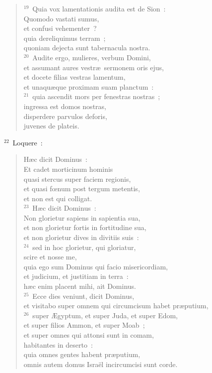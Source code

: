 \begin{verse}
${}^{19}$~Quia vox lamentationis audita est de Sion~:\\ Quomodo vastati sumus,\\ et confusi vehementer~?\\ quia dereliquimus terram~;\\ quoniam dejecta sunt tabernacula nostra.\\
${}^{20}$~Audite ergo, mulieres, verbum Domini,\\ et assumant aures vestr\ae\ sermonem oris ejus,\\ et docete filias vestras lamentum,\\ et unaqu\ae que proximam suam planctum~:\\
${}^{21}$~quia ascendit mors per fenestras nostras~;\\ ingressa est domos nostras,\\ disperdere parvulos deforis,\\ juvenes de plateis.\end{verse}


${}^{22}$~Loquere~: \begin{verse}H\ae c dicit Dominus~:\\ Et cadet morticinum hominis\\ quasi stercus super faciem regionis,\\ et quasi fœnum post tergum metentis,\\ et non est qui colligat.\\
${}^{23}$~H\ae c dicit Dominus~:\\ Non glorietur sapiens in sapientia sua,\\ et non glorietur fortis in fortitudine sua,\\ et non glorietur dives in divitiis suis~:\\
${}^{24}$~sed in hoc glorietur, qui gloriatur,\\ scire et nosse me,\\ quia ego sum Dominus qui facio misericordiam,\\ et judicium, et justitiam in terra~:\\ h\ae c enim placent mihi, ait Dominus.\\
${}^{25}$~Ecce dies veniunt, dicit Dominus,\\ et visitabo super omnem qui circumcisum habet pr\ae putium,\\
${}^{26}$~super \AE gyptum, et super Juda, et super Edom,\\ et super filios Ammon, et super Moab~;\\ et super omnes qui attonsi sunt in comam,\\ habitantes in deserto~:\\ quia omnes gentes habent pr\ae putium,\\ omnis autem domus Isra\"el incircumcisi sunt corde.\end{verse}


